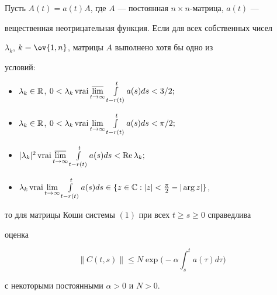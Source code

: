 \begin{thm} 


Пусть $A(t)=a(t)A$, где $A$ --- постоянная $n\times n$-матрица, $a(t)$ --- 


вещественная неотрицательная функция. Если для всех собственных чисел 


$\lambda_k$, $k=\ov{1,n}$, матрицы $A$ выполнено хотя бы одно из 


условий\/$:$ 


\begin{itemize} 


\item[а)] $\lambda_k\in\Bbb R$, $0<\lambda_k\vrai 


\underset{t\to\infty}{\varlimsup}\int\limits^t_{t-r(t)} 


a(s)d s<3/2;$ 


\item[б)] $\lambda_k\in \Bbb R$, $0<\lambda_k\vrai 


\lim\limits_{t\to\infty}\int\limits^t_{t-r(t)}a(s)d s<\pi/2;$ 


\item[в)] $|\lambda_k|^2\vrai 


\underset{t\to\infty}{\varlimsup}\int\limits^t_{t-r(t)} 


a(s)d s<\re\lambda_k;$ 


\item[г)] $\lambda_k\vrai\lim\limits_{t\to\infty} 


\int\limits^t_{t-r(t)}a(s)d s\in\{z\in\Bbb C:|z|<\frac{\pi}{2}- |\arg 


z|\}$, 


\end{itemize} 


то для матрицы Коши системы $(1)$ при всех $t\ge s\ge0$ справедлива 


оценка 


$$ 


\|C(t,s)\|\le N\exp\bigg(-\alpha\int^t_s a(\tau)d\tau \bigg) 


$$ 


с некоторыми постоянными $\alpha>0$ и $N>0$. 


\end{thm} 


 


